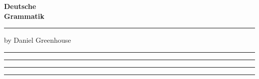 \thispagestyle{empty}
\begin{center}
  \vspace*{52mm}

  {\sffamily\bfseries\fontsize{30}{34}\selectfont\color{Ink} Deutsche\\[2pt] Grammatik}

  \vspace{7mm}
  {\color{Accent}\rule{45mm}{1.6pt}}

  \vspace{7mm}
  {\sffamily\large\color{Faint} by Daniel Greenhouse}

  \vfill

  {\textcolor{Masc}{\rule{8mm}{8mm}}\;\textcolor{Fem}{\rule{8mm}{8mm}}\;%
   \textcolor{Neut}{\rule{8mm}{8mm}}\;\textcolor{Plur}{\rule{8mm}{8mm}}}

  \vspace{22mm}
\end{center}
\cleardoublepage

